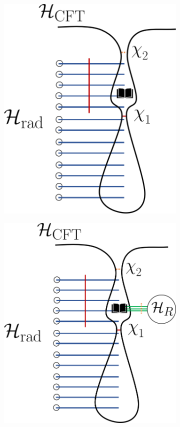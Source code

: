 \documentclass[12pt]{article}
\begin{document}
\begin{figure}[t]
\begin{subfigure}{.48\textwidth}
  \centering
 \includegraphics[width = 0.8\linewidth]{Evaporation_LargeDiary.png}
\end{subfigure}
\begin{subfigure}{.48\textwidth}
  \centering
 \includegraphics[width = 0.8\linewidth]{Evaporation_LargeDiary_Reference.png}

\end{subfigure}
\end{figure}
\end{document}
